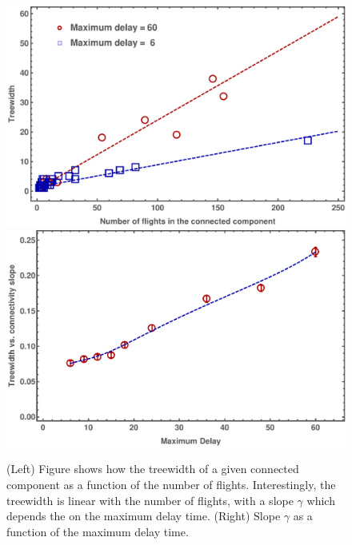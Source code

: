 \begin{figure}
  \includegraphics[width=\columnwidth]{pics/instances/treewidth_connectivity.pdf}
  \includegraphics[width=\columnwidth]{pics/instances/treewidth_pl.pdf}
  \caption{(Left) Figure shows how the treewidth of a given
  connected component as a function of the number of flights. Interestingly, the
  treewidth is linear with the number of flights, with a slope $\gamma$ which
  depends the on the maximum delay time. (Right) Slope $\gamma$ as a function
  of the maximum delay time.}
\label{fig:tw_vs_cc}
\end{figure}
